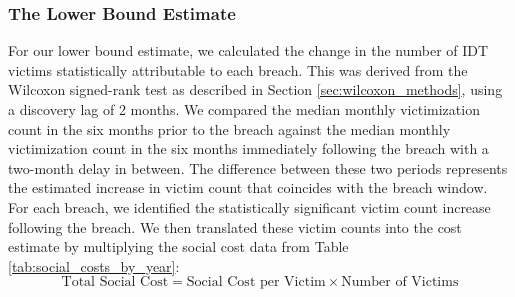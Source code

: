 \begin{enumerate}[label=(\alph*)]
\end{enumerate}

\subsubsection{The Lower Bound Estimate}
For our lower bound estimate, we calculated the change in the number of IDT victims statistically attributable to each breach. This was derived from the Wilcoxon signed-rank test as described in Section \ref{sec:wilcoxon_methods},  using a discovery lag of 2 months. We compared the median monthly victimization count in the six months prior to the breach against the median monthly victimization count in the six months immediately following the breach with a two-month delay in between. The difference between these two periods represents the estimated increase in victim count that coincides with the breach window. 
%
For each breach, we identified the statistically significant victim count increase following the breach. We then translated these victim counts into the  cost estimate by multiplying the social cost data from Table \ref{tab:social_costs_by_year}:  %
$$\text{Total Social Cost} = \text{Social Cost per Victim} \times \text{Number of Victims}$$

